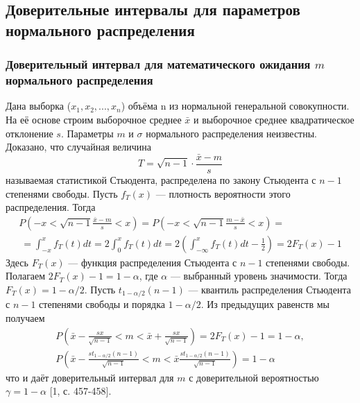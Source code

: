 \subsection{Доверительные интервалы для параметров нормального распределения}
\subsubsection{Доверительный интервал для математического ожидания $m$ нормального распределения}
Дана выборка ($x_{1},x_{2}, ... ,x_{n}$) объёма n из нормальной генеральной совокупности. На её основе строим выборочное среднее $\bar{x}$ и выборочное среднее квадратическое отклонение $s$. Параметры $m$ и $\sigma$ нормального распределения неизвестны.
\newline
Доказано, что случайная величина
\begin{equation}
T = \sqrt{n - 1}\cdot\frac{\bar{x} - m}{s}
\label{T}
\end{equation}
называемая статистикой Стьюдента, распределена по закону Стьюдента с $n-1$ степенями свободы. Пусть $f_{T}(x)$ — плотность вероятности этого распределения. Тогда 
\begin{multline}
P\left(-x < \sqrt{n - 1}\frac{\bar{x} - m}{s} < x \right) = 
P\left(-x < \sqrt{n - 1}\frac{m - \bar{x}}{s} < x \right) = \\\
= \int_{-x}^{x}{f_{T}(t)dt} = 2 \int_{0}^{x}{f_{T}(t)dt} = 
2\left(  \int_{-\infty}^{x}{f_{T}(t)dt} - \frac{1}{2} \right) = 2F_{T}(x) - 1
\label{P_f_t}
\end{multline}
Здесь $F_{T}(x)$ — функция распределения Стьюдента с $n-1$ степенями свободы.
\newline
Полагаем $2F_{T}(x)-1 = 1-\alpha$, где $\alpha$ — выбранный уровень значимости. Тогда $F_{T}(x) = 1-\alpha/2$. Пусть $t_{1-\alpha/2}(n-1)$ — квантиль распределения Стьюдента с $n-1$ степенями свободы и порядка $1-\alpha/2$. Из предыдущих равенств мы получаем 
\begin{equation}
\begin{split}
P\left(\bar{x} - \frac{sx}{\sqrt{n-1}} < m <  \bar{x} + \frac{sx}{\sqrt{n-1}}\right) = 2F_{T}(x) - 1 = 1 - \alpha, \\
P(\bar{x} - \frac{st_{1-\alpha/2}(n-1)}{\sqrt{n-1}} < m < \bar{x}\frac{st_{1-\alpha/2}(n-1)}{\sqrt{n-1}}) = 1 - \alpha
\end{split}
\end{equation}
что и даёт доверительный интервал для $m$ с доверительной вероятностью $\gamma = 1-\alpha$ [1, с. 457-458].

